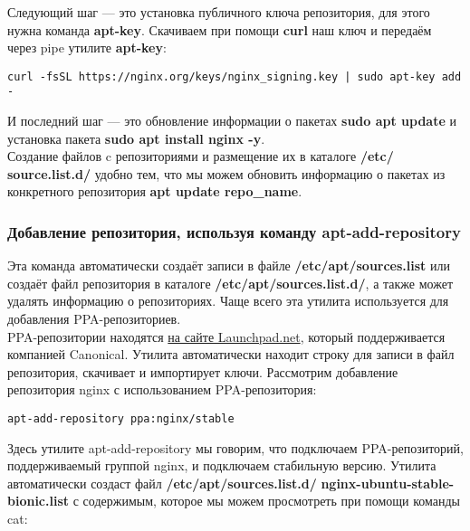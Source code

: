 \documentclass[14pt, a4paper]{article}
\begin{document}
Следующий шаг — это установка публичного ключа репозитория, для этого нужна команда \textbf{apt-key}.
Скачиваем при помощи \textbf{curl} наш ключ и передаём через pipe утилите \textbf{apt-key}:

\vspace{0.3cm}
\begin{lstlisting}
curl -fsSL https://nginx.org/keys/nginx_signing.key | sudo apt-key add -
\end{lstlisting}
\vspace{0.2cm}

И последний шаг — это обновление информации о пакетах \textbf{sudo apt update} и установка пакета 
\textbf{sudo apt install nginx -y}.\\

Создание файлов c репозиториями и размещение их в каталоге \textbf{/etc/} \textbf{source.list.d/} удобно тем, что мы
можем обновить информацию о пакетах из конкретного репозитория \textbf{apt update repo\_name}.

\subsubsection*{Добавление репозитория, используя команду apt-add-repository} 

Эта команда автоматически создаёт записи в файле \textbf{/etc/apt/sources.list} или создаёт файл
репозитория в каталоге \textbf{/etc/apt/sources.list.d/}, а также может удалять информацию о репозиториях.
Чаще всего эта утилита используется для добавления PPA-репозиториев.\\

PPA-репозитории находятся \href{https://launchpad.net/}{на сайте Launchpad.net}, который поддерживается компанией Canonical.
Утилита автоматически находит строку для записи в файл репозитория, скачивает и импортирует
ключи. Рассмотрим добавление репозитория nginx с использованием PPA-репозитория:

\vspace{0.3cm}
\begin{lstlisting}
apt-add-repository ppa:nginx/stable
\end{lstlisting}
\vspace{0.2cm}

Здесь утилите apt-add-repository мы говорим, что подключаем PPA-репозиторий, поддерживаемый
группой nginx, и подключаем стабильную версию. Утилита автоматически создаст файл
\textbf{/etc/apt/sources.list.d/} \textbf{nginx-ubuntu-stable-bionic.list} с содержимым, которое мы можем просмотреть
при помощи команды cat:
\end{document}
